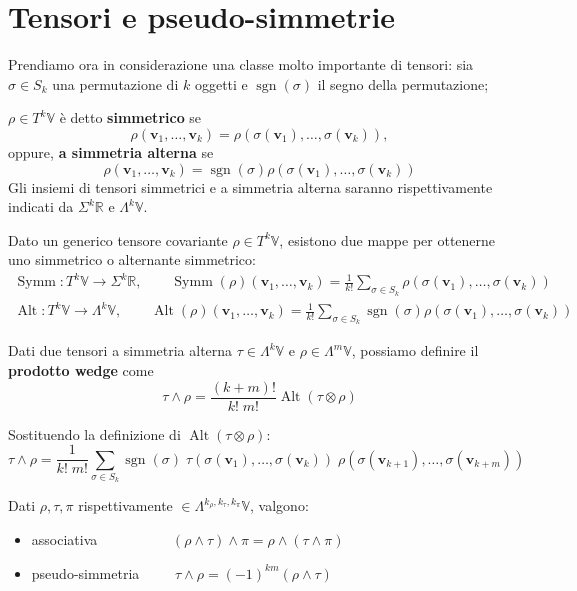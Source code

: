 \section{Tensori e pseudo-simmetrie}
Prendiamo ora in considerazione una classe molto importante di tensori: sia $\sigma \in S_k$ una permutazione di $k$ oggetti e $\operatorname{sgn}(\sigma)$ il segno della permutazione;
\begin{definition}
    $\rho \in T^k\mathbb{V}$ è detto \textbf{simmetrico} se
    \[
        \rho(\mathbf{v}_1, \dots, \mathbf{v}_k) = \rho(\sigma(\mathbf{v}_1), \dots, \sigma(\mathbf{v}_k)),
    \]
    oppure, \textbf{a simmetria alterna} se
    \[
        \rho(\mathbf{v}_1, \dots, \mathbf{v}_k) = \operatorname{sgn}(\sigma)\rho(\sigma(\mathbf{v}_1), \dots, \sigma(\mathbf{v}_k))
    \]
    Gli insiemi di tensori simmetrici e a simmetria alterna saranno rispettivamente indicati da $\Sigma^k\mathbb{R}$ e $\Lambda^k\mathbb{V}$.
\end{definition}
Dato un generico tensore covariante $\rho \in T^k\mathbb{V}$, esistono due mappe per ottenerne uno simmetrico o alternante simmetrico:
\begin{align}
    \operatorname{Symm} : T^k\mathbb{V} \longrightarrow \Sigma^k\mathbb{R}, \qquad \operatorname{Symm}(\rho)(\mathbf{v}_1, \dots, \mathbf{v}_k) = \frac{1}{k!}\sum_{\sigma \in S_k}\rho(\sigma(\mathbf{v}_1), \dots, \sigma(\mathbf{v}_k)) \\
    \operatorname{Alt} : T^k\mathbb{V} \longrightarrow \Lambda^k\mathbb{V}, \qquad \operatorname{Alt}(\rho)(\mathbf{v}_1, \dots, \mathbf{v}_k) = \frac{1}{k!}\sum_{\sigma \in S_k}\operatorname{sgn}(\sigma)\rho(\sigma(\mathbf{v}_1), \dots, \sigma(\mathbf{v}_k))
\end{align}
\begin{definition}
    Dati due tensori a simmetria alterna $\tau \in \Lambda^k\mathbb{V}$ e $\rho \in \Lambda^m\mathbb{V}$, possiamo definire il \textbf{prodotto wedge} come
    \begin{equation}
        \tau \wedge \rho = \frac{(k+m)!}{k! \; m!}\operatorname{Alt}(\tau \otimes \rho)
    \end{equation}
\end{definition}
Sostituendo la definizione di $\operatorname{Alt}(\tau \otimes \rho)$:
\[
    \tau \wedge \rho = \frac{1}{k! \; m!} \sum_{\sigma \in S_k}\operatorname{sgn}(\sigma) \; \tau(\sigma(\mathbf{v}_1), \dots, \sigma(\mathbf{v}_k)) \; \rho(\sigma(\mathbf{v}_{k+1}), \dots, \sigma(\mathbf{v}_{k+m}))
\]
\begin{property}
    Dati $\rho, \tau, \pi$ rispettivamente $\in \Lambda^{k_\rho, k_\tau, k_\pi} \mathbb{V}$, valgono:
    \begin{itemize}
        \item associativa $\qquad \quad \qquad (\rho \wedge \tau) \wedge \pi = \rho \wedge (\tau \wedge \pi)$
        \item pseudo-simmetria $\qquad \: \tau \wedge \rho = (-1)^{km}(\rho \wedge \tau)$
    \end{itemize}
\end{property}
